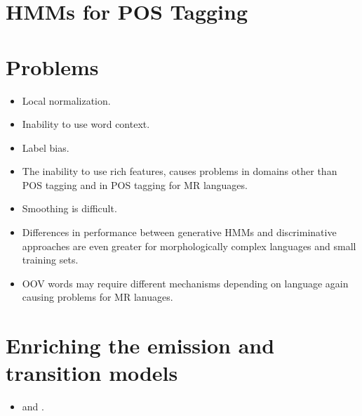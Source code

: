 \section{HMMs for POS Tagging}

\section{Problems}
\begin{itemize}
\item Local normalization.
\item Inability to use word context.
\item Label bias.
\item The inability to use rich features, causes problems in domains
  other than POS tagging and in POS tagging for MR languages.
\item Smoothing is difficult.
\item Differences in performance between generative HMMs and
  discriminative approaches are even greater for morphologically
  complex languages and small training sets.
\item OOV words may require different mechanisms depending on
  language again causing problems for MR lanuages.
\end{itemize}

\section{Enriching the emission and transition models}
\begin{itemize}
\item \cite{Halacsy2007} and \cite{Silfverberg2011}.
\end{itemize}
